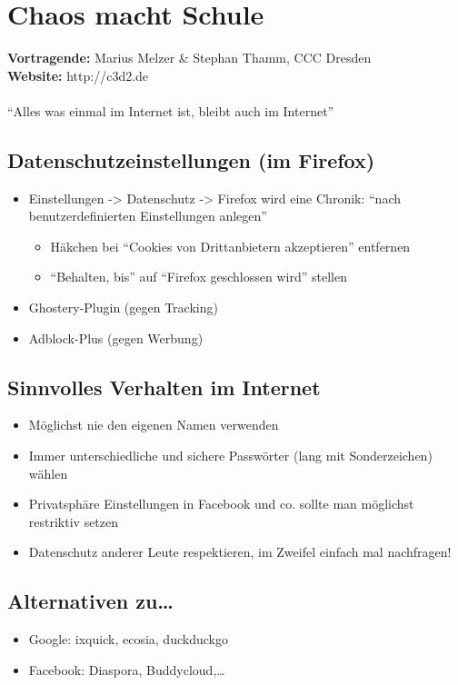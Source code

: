 \documentclass[a5paper]{scrartcl}
\begin{document}
\section*{Chaos macht Schule}

\textbf{Vortragende:} Marius Melzer \& Stephan Thamm, CCC Dresden\\
\textbf{Website:} http://c3d2.de\\
\\
``Alles was einmal im Internet ist, bleibt auch im Internet''
\subsection*{Datenschutzeinstellungen (im Firefox)}
\begin{itemize}
  \item Einstellungen -> Datenschutz -> Firefox wird eine Chronik: ``nach benutzerdefinierten Einstellungen anlegen''
    \begin{itemize}
      \item Häkchen bei ``Cookies von Drittanbietern akzeptieren'' entfernen
      \item ``Behalten, bis'' auf ``Firefox geschlossen wird'' stellen
    \end{itemize}
  \item Ghostery-Plugin (gegen Tracking)
  \item Adblock-Plus (gegen Werbung)
\end{itemize}
\subsection*{Sinnvolles Verhalten im Internet}
\begin{itemize}
  \item Möglichst nie den eigenen Namen verwenden
  \item Immer unterschiedliche und sichere Passwörter (lang mit Sonderzeichen) wählen
  \item Privatsphäre Einstellungen in Facebook und co. sollte man möglichst restriktiv setzen
  \item Datenschutz anderer Leute respektieren, im Zweifel einfach mal nachfragen!
\end{itemize}
\subsection*{Alternativen zu\ldots}
\begin{itemize}
  \item Google: ixquick, ecosia, duckduckgo
  \item Facebook: Diaspora, Buddycloud,\ldots
\end{itemize}
\end{document}
